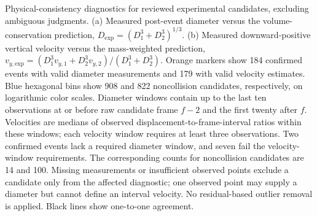 Physical-consistency diagnostics for reviewed experimental candidates, excluding ambiguous judgments. (a) Measured post-event diameter versus the volume-conservation prediction, \(D_{\mathrm{exp}}=(D_1^3+D_2^3)^{1/3}\). (b) Measured downward-positive vertical velocity versus the mass-weighted prediction, \(v_{y,\mathrm{exp}}=(D_1^3v_{y,1}+D_2^3v_{y,2})/(D_1^3+D_2^3)\). Orange markers show 184 confirmed events with valid diameter measurements and 179 with valid velocity estimates. Blue hexagonal bins show 908 and 822 noncollision candidates, respectively, on logarithmic color scales. Diameter windows contain up to the last ten observations at or before raw candidate frame \(f-2\) and the first twenty after \(f\). Velocities are medians of observed displacement-to-frame-interval ratios within these windows; each velocity window requires at least three observations. Two confirmed events lack a required diameter window, and seven fail the velocity-window requirements. The corresponding counts for noncollision candidates are 14 and 100. Missing measurements or insufficient observed points exclude a candidate only from the affected diagnostic; one observed point may supply a diameter but cannot define an interval velocity. No residual-based outlier removal is applied. Black lines show one-to-one agreement.
